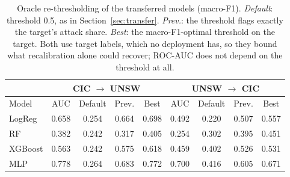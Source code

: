 \begin{table}[htbp]
\centering
\caption{Oracle re-thresholding of the transferred models (macro-F1). \emph{Default}: threshold 0.5, as in Section~\ref{sec:transfer}. \emph{Prev.}: the threshold flags exactly the target's attack share. \emph{Best}: the macro-F1-optimal threshold on the target. Both use target labels, which no deployment has, so they bound what recalibration alone could recover; ROC-AUC does not depend on the threshold at all.}
\label{tab:recal}
\footnotesize
\begin{tabular}{l|cccc|cccc}
\hline
 & \multicolumn{4}{c|}{CIC $\rightarrow$ UNSW} & \multicolumn{4}{c}{UNSW $\rightarrow$ CIC} \\
\hline
Model & AUC & Default & Prev. & Best & AUC & Default & Prev. & Best \\
\hline LogReg & 0.658 & 0.254 & 0.664 & 0.698 & 0.492 & 0.220 & 0.507 & 0.557 \\
RF & 0.382 & 0.242 & 0.317 & 0.405 & 0.254 & 0.302 & 0.395 & 0.451 \\
XGBoost & 0.563 & 0.242 & 0.575 & 0.618 & 0.459 & 0.402 & 0.526 & 0.531 \\
MLP & 0.778 & 0.264 & 0.683 & 0.772 & 0.700 & 0.416 & 0.605 & 0.671 \\
\hline
\end{tabular}
\end{table}
